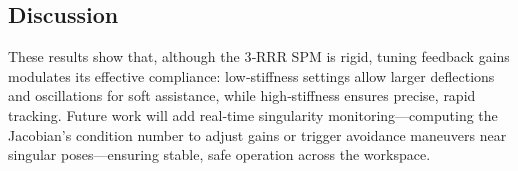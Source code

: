 \documentclass[letterpaper, 10 pt, conference]{ieeeconf}  %
\begin{document}
\subsection{Discussion}
These results show that, although the 3‑RRR SPM is rigid, tuning feedback gains modulates its effective compliance: low‑stiffness settings allow larger deflections and oscillations for soft assistance, while high‑stiffness ensures precise, rapid tracking. Future work will add real‑time singularity monitoring—computing the Jacobian’s condition number to adjust gains or trigger avoidance maneuvers near singular poses—ensuring stable, safe operation across the workspace.






\end{document}
